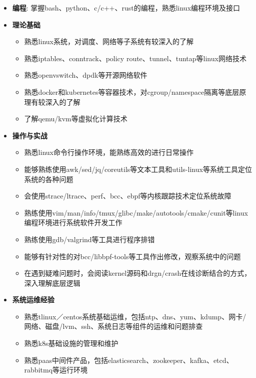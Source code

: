 \begin{itemize}[parsep=0.2ex]
  \item \textbf{编程}: 掌握bash、python、c/c++、rust的编程，熟悉linux编程环境及接口
  \item \textbf{理论基础}
    \begin{itemize}
      \item 熟悉linux系统，对调度、网络等子系统有较深入的了解
      \item 熟悉iptables、conntrack、policy route、tunnel、tuntap等linux网络技术
      \item 熟悉openvswitch、dpdk等开源网络软件
      \item 熟悉docker和kubernetes等容器技术，对cgroup/namespace隔离等底层原理有较深入的了解
      \item 了解qemu/kvm等虚拟化计算技术
    \end{itemize}
  \item \textbf{操作与实战}
    \begin{itemize}
      \item 熟悉linux命令行操作环境，能熟练高效的进行日常操作
      \item 能够熟练使用awk/sed/jq/coreutils等文本工具和utils-linux等系统工具定位系统的各种问题
      \item 会使用strace/ltrace、perf、bcc、ebpf等内核跟踪技术定位系统故障
      \item 熟练使用vim/man/info/tmux/glibc/make/autotools/cmake/cunit等linux编程环境进行系统软件开发工作
      \item 熟练使用gdb/valgrind等工具进行程序排错
      \item 能够有针对性的对bcc/libbpf-tools等工具作出修改，观察系统中的问题
      \item 在遇到疑难问题时，会阅读kernel源码和drgn/crash在线诊断结合的方式，深入理解底层逻辑
    \end{itemize}
  \item \textbf{系统运维经验}
    \begin{itemize}
      \item 熟悉tlinux／centos系统基础运维，包括ntp、dns、yum、kdump、网卡/网络、磁盘/lvm、ssh、系统日志等组件的运维和问题排查
      \item 熟悉k8s基础设施的管理和维护
      \item 熟悉paas中间件产品，包括elasticsearch、zookeeper、kafka、etcd、rabbitmq等运行环境
    \end{itemize}
\end{itemize}
